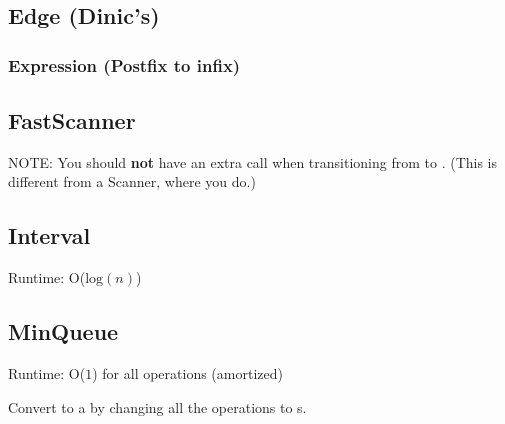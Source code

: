 

\subsection*{Edge (Dinic's)}



\subsubsection*{Expression (Postfix to infix)}



\subsection*{FastScanner}

NOTE: You should \textbf{not} have an extra  call when transitioning from  to . (This is different from a Scanner, where you do.)



\subsection*{Interval}

Runtime: O($\text{log}(n)$)



\subsection*{MinQueue}

Runtime: O($1$) for all operations (amortized)

Convert to a  by changing all the  operations to s.




\newpage
